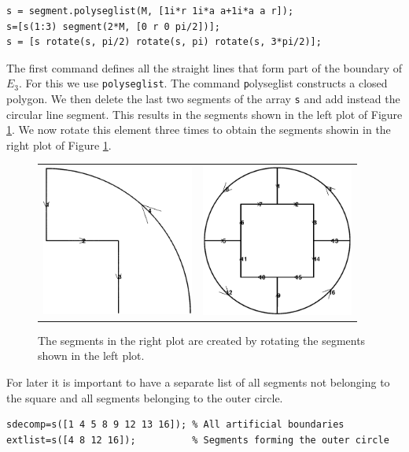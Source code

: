 \begin{verbatim}
s = segment.polyseglist(M, [1i*r 1i*a a+1i*a a r]);
s=[s(1:3) segment(2*M, [0 r 0 pi/2])];
s = [s rotate(s, pi/2) rotate(s, pi) rotate(s, 3*pi/2)];
\end{verbatim}
The first command defines all the straight lines that form part of the
boundary of $E_3$. For this we use {\texttt{polyseglist}}. The command
{\texttt polyseglist} constructs a closed polygon. We then delete the
last two segments of the array {\texttt s} and add instead the
circular line segment. This results in the segments shown in the left
plot of Figure \ref{fig:circelem}. We now rotate this element three times to
obtain the segments showin in the right plot of Figure \ref{fig:circelem}.
\begin{figure}
\begin{tabular}{cc}
\includegraphics[width=5cm]{circelem1} &
\includegraphics[width=5cm]{circelem2}
\end{tabular}
\caption{The segments in the right plot are created by rotating the segments
  shown in the left plot.}
\label{fig:circelem}
\end{figure}

For later it is important to have a separate list of all segments not
belonging to the square and all segments belonging to the outer
circle.

\begin{verbatim}
sdecomp=s([1 4 5 8 9 12 13 16]); % All artificial boundaries
extlist=s([4 8 12 16]);          % Segments forming the outer circle
\end{verbatim}

